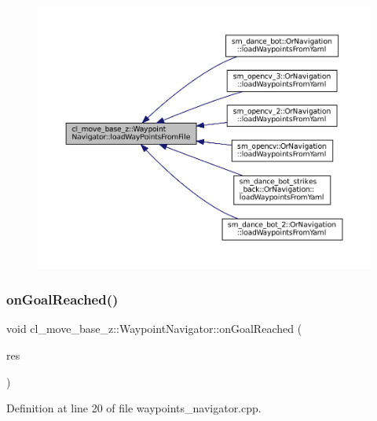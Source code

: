 \begin{figure}[H]
\begin{center}
\leavevmode
\includegraphics[width=350pt]{classcl__move__base__z_1_1WaypointNavigator_a18d74467ddf0e637a8d5a6e1fa2e93db_icgraph}
\end{center}
\end{figure}
\mbox{\label{classcl__move__base__z_1_1WaypointNavigator_ae10ba80b7e46b62096cac96609f66893}} 
\subsubsection{\texorpdfstring{on\+Goal\+Reached()}{onGoalReached()}}
{\footnotesize\ttfamily void cl\+\_\+move\+\_\+base\+\_\+z\+::\+Waypoint\+Navigator\+::on\+Goal\+Reached (\begin{DoxyParamCaption}\item[{\hyperlink{classcl__move__base__z_1_1ClMoveBaseZ_a99373d0c15ae96684462d8677f5fd632}{Cl\+Move\+Base\+Z\+::\+Result\+Const\+Ptr} \&}]{res }\end{DoxyParamCaption})\hspace{0.3cm}{\ttfamily [private]}}



Definition at line 20 of file waypoints\+\_\+navigator.\+cpp.



